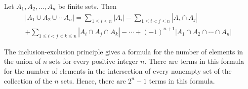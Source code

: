 \documentclass[../discrete.tex]{subfiles}
\begin{document}
\begin{theorem}
    Let $A_1,A_2,\dots,A_n$ be finite sets. Then 
    \begin{align*}
        |A_1 \cup A_2 \cup \cdots A_n| = \sum_{1\leq i\leq n}|A_i|-\sum_{1\leq i< j\leq n}|A_i\cap A_j|\\
        + \sum_{1\leq i<j<k\leq n}|A_i\cap A_j\cap A_k|-\cdots+(-1)^{n+1}|A_1\cap A_2 \cap \cdots \cap A_n|
    \end{align*}
\end{theorem}

The inclusion-exclusion principle gives a formula for the number of elements in the union of $n$ sets for every positive integer $n$. There are terms in this formula for the number 
of elements in the intersection of every nonempty set of the collection of the $n$ sets. Hence, there are $2^n-1$ terms in this formula.
\end{document}
